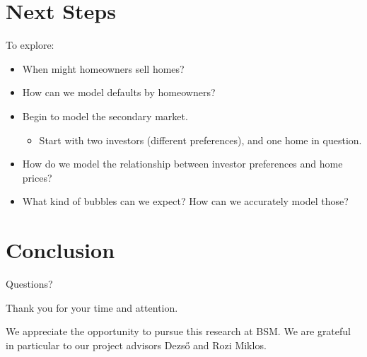 \documentclass{beamer}
\begin{document}
\section{Next Steps}
 \begin{frame}
 To explore:
\begin{itemize}
\pause
\item
When might homeowners sell homes?
\pause
\item
How can we model defaults by homeowners?
\pause
\item
Begin to model the secondary market.
\begin{itemize}
\item
Start with two investors (different preferences), and one home in question.
\end{itemize}
\end{itemize}
\end{frame}

\begin{frame}
\begin{itemize}
\item
How do we model the relationship between investor preferences and home prices?
\item
What kind of bubbles can we expect? How can we accurately model those?
\end{itemize}

\end{frame}

\section{Conclusion}

\begin{frame}
\begin{center}
Questions?
\end{center}
\end{frame}

\begin{frame}
\begin{center}
Thank you for your time and attention.\bigskip

We appreciate the opportunity to pursue this research at BSM.
We are grateful in particular to our project advisors Dezs\H{o} and
Rozi Miklos.
\end{center}
\end{frame}
\end{document}
